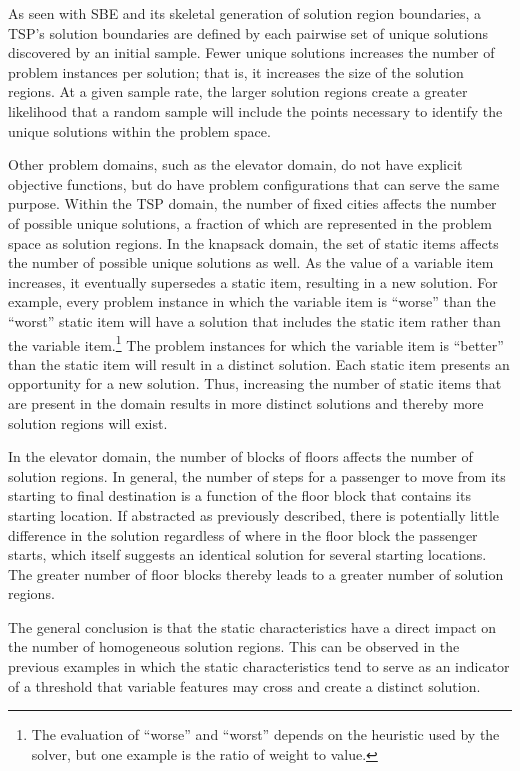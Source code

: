 As  seen with SBE and its skeletal generation of solution region boundaries, a TSP's solution boundaries are defined by each pairwise set of unique solutions discovered by an initial sample.  Fewer unique solutions increases the number of problem instances per solution; that is, it increases the size of the solution regions.  At a given sample rate, the larger solution regions create a greater likelihood that  a random sample will include the points necessary to identify the unique solutions within the problem space.

Other problem domains, such as the elevator domain, do not have explicit objective functions, but do have problem configurations that can serve the same purpose.  Within the TSP domain, the number of fixed cities affects the number of possible unique solutions, a fraction of which are represented in the problem space as solution regions.  In the knapsack domain, the set of static items affects the number of possible unique solutions as well.  As the value of a variable item increases, it eventually supersedes a  static item, resulting in a new solution.  For example, every problem instance in which the variable item is ``worse'' than the ``worst'' static item will have a solution that includes the static item rather than the variable item.\footnote{The evaluation of ``worse'' and ``worst'' depends on the heuristic used by the solver, but one example is the ratio of weight to value.}  The problem instances for which the variable item is ``better'' than the static item will result in a distinct solution.  Each static item presents an opportunity for a new solution. Thus, increasing the number of static items that are present in the domain results in  more distinct solutions and thereby more solution regions will exist.  

In the elevator domain, the number of blocks of floors affects the number of solution regions.  In general, the number of steps for a passenger to move from its starting to final destination is a function of the floor block that contains its starting location.  If abstracted as previously described, there is potentially little difference in the solution regardless of where in the floor block the passenger starts, which itself suggests an identical solution for several starting locations.  The greater number of floor blocks thereby leads to a greater number of solution regions.

The general conclusion is that the static characteristics have a direct impact on the number of homogeneous solution regions.  This can be observed in the previous examples in which the static characteristics tend to serve as an indicator of a threshold that variable features may cross and create a distinct solution.

